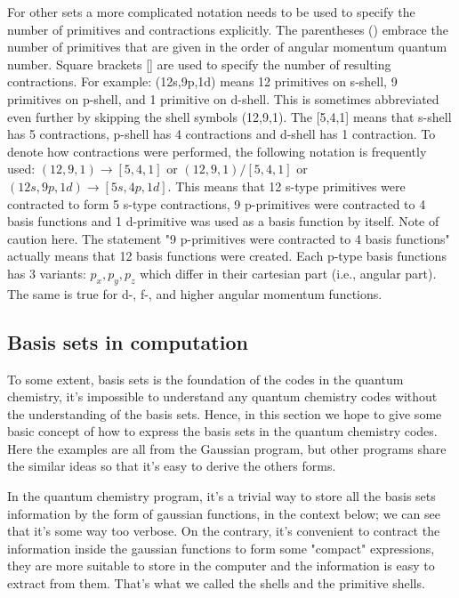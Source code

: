 For other sets a more complicated notation needs to be used to specify
the number of primitives and contractions explicitly. The parentheses
() embrace the number of primitives that are given in the order of
angular momentum quantum number. Square brackets [] are used to
specify the number of resulting contractions. For example: (12s,9p,1d)
means 12 primitives on s-shell, 9 primitives on p-shell, and 1
primitive on d-shell. This is sometimes abbreviated even further by
skipping the shell symbols (12,9,1). The [5,4,1] means that s-shell
has 5 contractions, p-shell has 4 contractions and d-shell has 1
contraction. To denote how contractions were performed, the following
notation is frequently used: $(12,9,1) \rightarrow [5,4,1]$ or
$(12,9,1)/[5,4,1]$ or $(12s,9p,1d) \rightarrow [5s,4p,1d]$. This means
that 12 s-type primitives were contracted to form 5 s-type
contractions, 9 p-primitives were contracted to 4 basis functions and
1 d-primitive was used as a basis function by itself. Note of caution
here. The statement "9 p-primitives were contracted to 4 basis
functions" actually means that 12 basis functions were created. Each
p-type basis functions has 3 variants: $p_{x}, p_{y}, p_{z}$ which
differ in their cartesian part (i.e., angular part). The same is true
for d-, f-, and higher angular momentum functions.

\subsection{Basis sets in computation}
%
%
%
To some extent, basis sets is the foundation of the codes in the
quantum chemistry, it's impossible to understand any quantum chemistry
codes without the understanding of the basis sets. Hence, in this
section we hope to give some basic concept of how to express the basis
sets in the quantum chemistry codes. Here the examples are all from
the Gaussian program, but other programs share the similar ideas so
that it's easy to derive the others forms.

In the quantum chemistry program, it's a trivial way to store all the
basis sets information by the form of gaussian functions, in the
context below; we can see that it's some way too verbose. On the
contrary, it's convenient to contract the information inside the
gaussian functions to form some "compact" expressions, they are more
suitable to store in the computer and the information is easy to
extract from them. That's what we called the shells and the primitive
shells.

